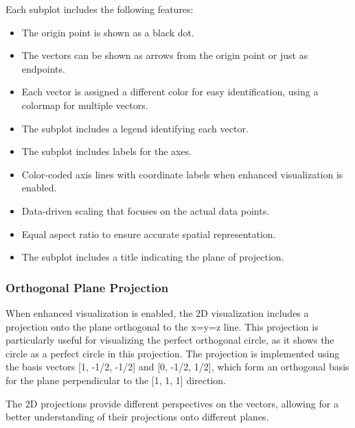 Each subplot includes the following features:

\begin{itemize}
    \item The origin point is shown as a black dot.
    \item The vectors can be shown as arrows from the origin point or just as endpoints.
    \item Each vector is assigned a different color for easy identification, using a colormap for multiple vectors.
    \item The subplot includes a legend identifying each vector.
    \item The subplot includes labels for the axes.
    \item Color-coded axis lines with coordinate labels when enhanced visualization is enabled.
    \item Data-driven scaling that focuses on the actual data points.
    \item Equal aspect ratio to ensure accurate spatial representation.
    \item The subplot includes a title indicating the plane of projection.
\end{itemize}

\subsubsection{Orthogonal Plane Projection}

When enhanced visualization is enabled, the 2D visualization includes a projection onto the plane orthogonal to the x=y=z line. This projection is particularly useful for visualizing the perfect orthogonal circle, as it shows the circle as a perfect circle in this projection. The projection is implemented using the basis vectors [1, -1/2, -1/2] and [0, -1/2, 1/2], which form an orthogonal basis for the plane perpendicular to the [1, 1, 1] direction.

The 2D projections provide different perspectives on the vectors, allowing for a better understanding of their projections onto different planes.

